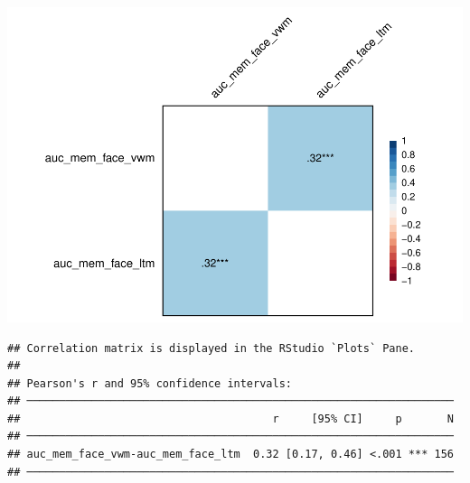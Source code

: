 \documentclass[
  man]{apa6}
\begin{document}
\includegraphics{Script_Re_Greer_2023_group1Rock_2023_files/figure-latex/unnamed-chunk-3-1.pdf}

\begin{verbatim}
## Correlation matrix is displayed in the RStudio `Plots` Pane.
## 
## Pearson's r and 95% confidence intervals:
## ──────────────────────────────────────────────────────────────────
##                                       r     [95% CI]     p       N
## ──────────────────────────────────────────────────────────────────
## auc_mem_face_vwm-auc_mem_face_ltm  0.32 [0.17, 0.46] <.001 *** 156
## ──────────────────────────────────────────────────────────────────
\end{verbatim}
\end{document}
